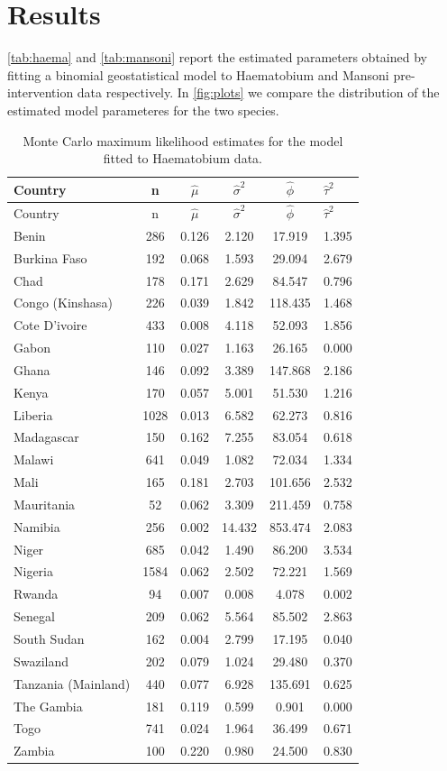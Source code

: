 \documentclass[11pt,]{article}
\begin{document}
\hypertarget{results}{%
\section{Results}\label{results}}

\autoref{tab:haema} and \autoref{tab:mansoni} report the estimated
parameters obtained by fitting a binomial geostatistical model to
Haematobium and Mansoni pre-intervention data respectively. In
\autoref{fig:plots} we compare the distribution of the estimated model
parameteres for the two species.

\begin{longtable}[]{@{}lccccl@{}}
\caption{\label{tab:haema} Monte Carlo maximum likelihood estimates for
the model fitted to Haematobium data.}\tabularnewline
\toprule
Country & n & \(\hat{\mu}\) & \(\hat{\sigma}^2\) & \(\hat{\phi}\) &
\(\hat{\tau}^2\)\tabularnewline
\midrule
\endfirsthead
\toprule
Country & n & \(\hat{\mu}\) & \(\hat{\sigma}^2\) & \(\hat{\phi}\) &
\(\hat{\tau}^2\)\tabularnewline
\midrule
\endhead
Benin & 286 & 0.126 & 2.120 & 17.919 & 1.395\tabularnewline
Burkina Faso & 192 & 0.068 & 1.593 & 29.094 & 2.679\tabularnewline
Chad & 178 & 0.171 & 2.629 & 84.547 & 0.796\tabularnewline
Congo (Kinshasa) & 226 & 0.039 & 1.842 & 118.435 & 1.468\tabularnewline
Cote D'ivoire & 433 & 0.008 & 4.118 & 52.093 & 1.856\tabularnewline
Gabon & 110 & 0.027 & 1.163 & 26.165 & 0.000\tabularnewline
Ghana & 146 & 0.092 & 3.389 & 147.868 & 2.186\tabularnewline
Kenya & 170 & 0.057 & 5.001 & 51.530 & 1.216\tabularnewline
Liberia & 1028 & 0.013 & 6.582 & 62.273 & 0.816\tabularnewline
Madagascar & 150 & 0.162 & 7.255 & 83.054 & 0.618\tabularnewline
Malawi & 641 & 0.049 & 1.082 & 72.034 & 1.334\tabularnewline
Mali & 165 & 0.181 & 2.703 & 101.656 & 2.532\tabularnewline
Mauritania & 52 & 0.062 & 3.309 & 211.459 & 0.758\tabularnewline
Namibia & 256 & 0.002 & 14.432 & 853.474 & 2.083\tabularnewline
Niger & 685 & 0.042 & 1.490 & 86.200 & 3.534\tabularnewline
Nigeria & 1584 & 0.062 & 2.502 & 72.221 & 1.569\tabularnewline
Rwanda & 94 & 0.007 & 0.008 & 4.078 & 0.002\tabularnewline
Senegal & 209 & 0.062 & 5.564 & 85.502 & 2.863\tabularnewline
South Sudan & 162 & 0.004 & 2.799 & 17.195 & 0.040\tabularnewline
Swaziland & 202 & 0.079 & 1.024 & 29.480 & 0.370\tabularnewline
Tanzania (Mainland) & 440 & 0.077 & 6.928 & 135.691 &
0.625\tabularnewline
The Gambia & 181 & 0.119 & 0.599 & 0.901 & 0.000\tabularnewline
Togo & 741 & 0.024 & 1.964 & 36.499 & 0.671\tabularnewline
Zambia & 100 & 0.220 & 0.980 & 24.500 & 0.830\tabularnewline
\bottomrule
\end{longtable}
\end{document}
